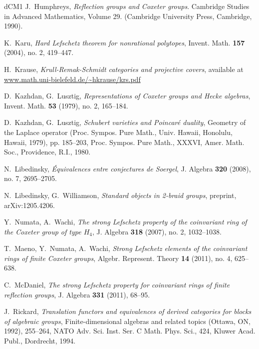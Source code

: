 \documentclass[11pt]{amsart}
\numberwithin{equation}{section}
\theoremstyle{definition}
\theoremstyle{remark}
\begin{document}
{\begin{thebibliography}{dCM1}
J.~Humphreys, \emph{Reflection groups and Coxeter groups}. Cambridge
Studies in Advanced Mathematics, Volume 29. (Cambridge University Press,
Cambridge, 1990).



K.~Karu,
\textit{Hard Lefschetz theorem for nonrational polytopes},
Invent. Math. \textbf{157} (2004), no. 2, 419--447.

H.~Krause,
\textit{Krull-Remak-Schmidt categories and projective covers},
available at \url{www.math.uni-bielefeld.de/~hkrause/krs.pdf}

D.~Kazhdan, G.~Lusztig, \textit{Representations of Coxeter groups and
  Hecke algebras},  Invent. Math. \textbf{53} (1979), no. 2, 165--184.

D.~Kazhdan, G.~Lusztig, \textit{Schubert varieties and Poincar\'e
  duality}, Geometry of the Laplace operator (Proc. Sympos. Pure Math., Univ. Hawaii, Honolulu, Hawaii, 1979), pp. 185--203, Proc. Sympos. Pure Math., XXXVI, Amer. Math. Soc., Providence, R.I., 1980.

N.~Libedinsky, \textit{\'Equivalences entre conjectures de Soergel},
 J. Algebra \textbf{320} (2008), no. 7, 2695--2705.

N.~Libedinsky, G.~Williamson, \textit{Standard objects in 2-braid
  groups}, preprint, arXiv:1205.4206.


Y.~Numata, A.~Wachi, 
\textit{The strong Lefschetz property of the coinvariant ring of the Coxeter group of type $H_4$},
J. Algebra \textbf{318} (2007), no. 2, 1032--1038. 

T.~Maeno, Y.~Numata, A.~Wachi, 
\textit{Strong Lefschetz elements of the coinvariant rings of finite Coxeter groups},
Algebr. Represent. Theory \textbf{14} (2011), no. 4, 625--638. 

C.~McDaniel, 
\textit{The strong Lefschetz property for coinvariant rings of finite
  reflection groups}, J. Algebra \textbf{331} (2011), 68--95.

J.~Rickard,
\textit{Translation functors and equivalences of derived categories
  for blocks of algebraic groups}, Finite-dimensional algebras and
related topics (Ottawa, ON, 1992), 255--264, 
NATO Adv. Sci. Inst. Ser. C Math. Phys. Sci., 424, Kluwer Acad. Publ., Dordrecht, 1994.


\end{thebibliography}}
\end{document}
